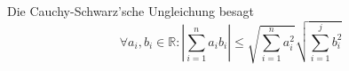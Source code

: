 Die Cauchy-Schwarz'sche Ungleichung besagt
$$\forall a_i, b_i \in \mathbb{R} : | \sum\limits_{i = 1}^n a_i b_i | \leq \sqrt{\sum\limits_{i=1}^n a_i^2} \sqrt{\sum\limits_{i=1}^j b_i^2}$$ 
